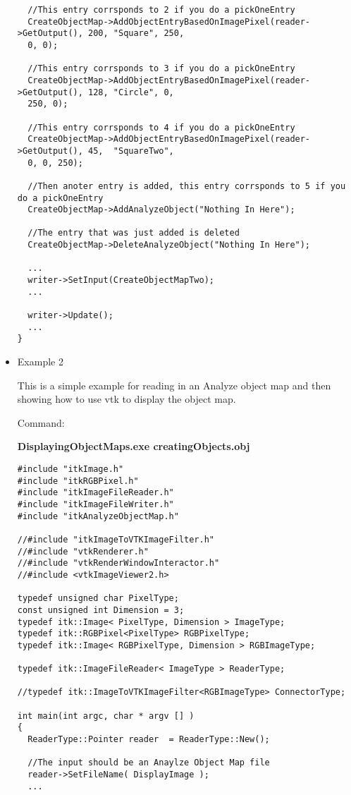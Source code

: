 \documentclass{InsightArticle}
\begin{document}
\begin{itemize}
\begin{verbatim}
  //This entry corrsponds to 2 if you do a pickOneEntry
  CreateObjectMap->AddObjectEntryBasedOnImagePixel(reader->GetOutput(), 200, "Square", 250,
  0, 0);

  //This entry corrsponds to 3 if you do a pickOneEntry
  CreateObjectMap->AddObjectEntryBasedOnImagePixel(reader->GetOutput(), 128, "Circle", 0,
  250, 0);

  //This entry corrsponds to 4 if you do a pickOneEntry
  CreateObjectMap->AddObjectEntryBasedOnImagePixel(reader->GetOutput(), 45,  "SquareTwo",
  0, 0, 250);

  //Then anoter entry is added, this entry corrsponds to 5 if you do a pickOneEntry
  CreateObjectMap->AddAnalyzeObject("Nothing In Here");

  //The entry that was just added is deleted
  CreateObjectMap->DeleteAnalyzeObject("Nothing In Here");
  
  ...
  writer->SetInput(CreateObjectMapTwo);
  ...
  
  writer->Update();
  ...
}
\end{verbatim} \normalsize

\item Example 2

This is a simple example for reading in an Analyze object map and
then showing how to use vtk to display the object map. 


Command:

\textbf{DisplayingObjectMaps.exe creatingObjects.obj}

\small \begin{verbatim}
#include "itkImage.h"
#include "itkRGBPixel.h"
#include "itkImageFileReader.h"
#include "itkImageFileWriter.h"
#include "itkAnalyzeObjectMap.h"

//#include "itkImageToVTKImageFilter.h"
//#include "vtkRenderer.h"
//#include "vtkRenderWindowInteractor.h"
//#include <vtkImageViewer2.h>

typedef unsigned char PixelType;
const unsigned int Dimension = 3;
typedef itk::Image< PixelType, Dimension > ImageType;
typedef itk::RGBPixel<PixelType> RGBPixelType;
typedef itk::Image< RGBPixelType, Dimension > RGBImageType;

typedef itk::ImageFileReader< ImageType > ReaderType;

//typedef itk::ImageToVTKImageFilter<RGBImageType> ConnectorType;

int main(int argc, char * argv [] )
{
  ReaderType::Pointer reader  = ReaderType::New();
  
  //The input should be an Anaylze Object Map file
  reader->SetFileName( DisplayImage );
  ...
  

\end{verbatim}
\end{itemize}
\end{document}
